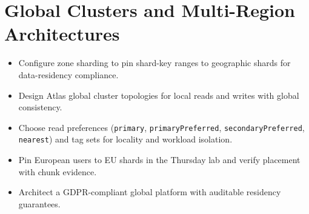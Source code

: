 \chapter{Global Clusters and Multi-Region Architectures}
%

\begin{objectives}
\begin{itemize}
    \item Configure zone sharding to pin shard-key ranges to geographic shards for data-residency compliance.
    \item Design Atlas global cluster topologies for local reads and writes with global consistency.
    \item Choose read preferences (\texttt{primary}, \texttt{primaryPreferred}, \texttt{secondaryPreferred}, \texttt{nearest}) and tag sets for locality and workload isolation.
    \item Pin European users to EU shards in the Thursday lab and verify placement with chunk evidence.
    \item Architect a GDPR-compliant global platform with auditable residency guarantees.
\end{itemize}
\end{objectives}

